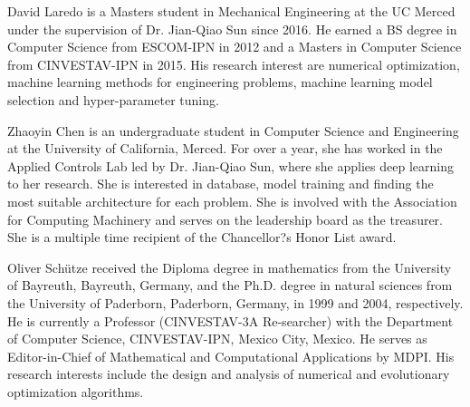 
\begin{biography}{David Laredo}
is a Masters student in Mechanical Engineering at the UC Merced under the supervision of Dr. Jian-Qiao Sun since 2016. He earned a BS degree in Computer Science from ESCOM-IPN in 2012 and a Masters in Computer Science from CINVESTAV-IPN in 2015. His research interest are numerical optimization, machine learning methods for engineering problems, machine learning model selection and hyper-parameter tuning.
\end{biography}

\begin{biography}{Zhaoyin Chen}
is an undergraduate student in Computer Science and Engineering at the University of California,
Merced. For over a year, she has worked in the Applied Controls
Lab led by Dr. Jian-Qiao Sun, where she applies deep learning to her research.
She is interested in database, model training and finding the most
suitable architecture for each problem. She is involved
with the Association for Computing Machinery and serves
on the leadership board as the treasurer. She is a multiple time
recipient of the Chancellor?s Honor List award.
\end{biography}

\begin{biography}{Oliver Sch\"utze}
received the Diploma degree in mathematics from the University
of Bayreuth, Bayreuth, Germany, and the Ph.D. degree in natural
sciences from the University of Paderborn, Paderborn, Germany, in
1999 and 2004, respectively. He is
currently a Professor (CINVESTAV-3A Re-searcher) with the Department
of Computer Science, CINVESTAV-IPN, Mexico City, Mexico. He serves as Editor-in-Chief of Mathematical and Computational Applications by MDPI. His research interests include the design and analysis of numerical and evolutionary optimization algorithms.
\end{biography}

